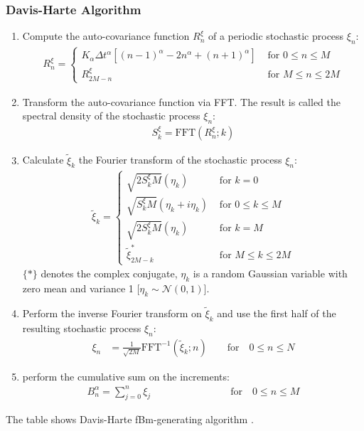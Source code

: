 \documentclass[
  a4paper,BCOR10mm,twoside,
  headsepline,footsepline,%
  fleqn,openbib
]{scrbook}
\begin{document}
\subsubsection{Davis-Harte Algorithm}
\begin{table}[h!]
 \begin{framed}
\begin{enumerate}
 \item Compute the auto-covariance function $R^{\xi}_n$ of a periodic stochastic process $\xi_n$:
 \begin{align}
  R^{\xi}_n= 
  \begin{cases}
    K_{\alpha} \Delta t^{\alpha}\left[(n-1)^{\alpha}-2n^{\alpha}+(n+1)^{\alpha}\right] & \text{ for    } 0 \leq n \leq M \\
   R^{\xi}_{2M-n}  & \text{ for    } M \leq n \leq 2M 
  \end{cases}
 \end{align}
 \item Transform the auto-covariance function via FFT. The result is called the spectral density of the stochastic process $\xi_n$:
  \begin{align}
   S^{\xi}_k= \mathrm{FFT}(R^{\xi}_n;k)
  \end{align}
 \item Calculate $\tilde\xi_k$ the Fourier transform of the stochastic process $\xi_n$:
 \begin{align}
  \tilde\xi_k=
  \begin{cases}
     \sqrt{2 S^{\xi}_k M}(\eta_k) & \text{ for    } k=0 \\    
     \sqrt{ S^{\xi}_k M}(\eta_k+i \eta_k)  & \text{ for    } 0 \leq k \leq M \\
     \sqrt{2 S^{\xi}_k M}(\eta_k)  & \text{ for    } k = M \\
     \tilde\xi^{*}_{2M-k} & \text{ for    } M \leq k \leq 2M 
  \end{cases}
 \end{align}
 $\{*\}$ denotes the complex conjugate, $\eta_k$ is a random Gaussian variable with zero mean and variance 1 [$\eta_k\sim \mathcal{N}(0,1)$].  
 \item Perform the inverse Fourier transform on $\tilde\xi_k$ and use the first half of the resulting stochastic process $\xi_n$:
 \begin{align}
  \xi_n&=\frac{1}{\sqrt{2 M}} \mathrm{FFT}^{-1}(\tilde\xi_k;n) \qquad \text{for} \quad 0 \leq n \leq N
 \end{align}
 \item perform the cumulative sum on the increments:
 \begin{align}
  B^{\alpha}_n=\sum^n_{j=0} \xi_j \qquad \qquad \qquad \qquad \text{for} \quad 0 \leq n \leq M
 \end{align}
\end{enumerate}
\end{framed}
\caption{The table shows Davis-Harte fBm-generating algorithm \cite{DAVIES1987}.}
\label{Davies_harte-algorithm}
\end{table}
\end{document}
